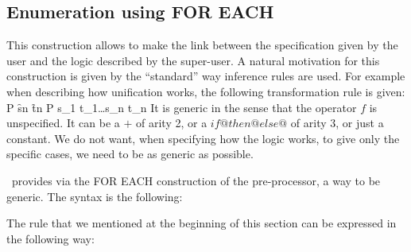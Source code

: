 \subsection{Enumeration using FOR EACH}\label{for each}

This construction allows to make the link between the specification
given by the user and the logic described by the super-user. A natural
motivation for this construction is given by the ``standard'' way
inference rules are used. For example when describing how unification
works, the following transformation rule is given:
\renewcommand{\fleche}{\ra}
        {P \ww \f{s}{n} \eqq \f{t}{n} }
        {P \ww s_1 \eqq t_1\ww \ldots \ww s_n \eqq t_n }
It is generic in the sense that the operator $f$ is unspecified. It
can be a $+$ of arity 2, or a $if@then@else@$ of arity 3, or just a
constant. We do not want, when specifying how the logic works, to give
only the specific cases, we need to be as generic as possible.

\elan\ provides via the FOR EACH construction of the pre-processor, a
way to be generic. The syntax is the following:

 {
      \sym{: \{}
      \nl
  \sym{\}}
}





\EX
The rule  that we mentioned at the beginning of
this section can be expressed in the following way:\\

